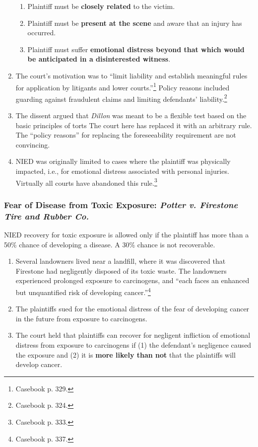 \begin{enumerate}
\begin{enumerate}
        \item Plaintiff must be \textbf{closely related} to the victim.
        \item Plaintiff must be \textbf{present at the scene} and aware that 
        an injury has occurred.
        \item Plaintiff must suffer \textbf{emotional distress beyond that 
        which would be anticipated in a disinterested witness}.
    \end{enumerate}
    \item The court's motivation was to ``limit liability and establish 
    meaningful rules for application by litigants and lower 
    courts.''\footnote{Casebook p. 329.} Policy reasons included guarding 
    against fraudulent claims and limiting defendants' 
    liability.\footnote{Casebook p. 324.}
    \item The dissent argued that \emph{Dillon} was meant to be a flexible 
    test based on the basic principles of torts The court here has replaced it 
    with an arbitrary rule. The ``policy reasons'' for replacing the 
    foreseeability requirement are not convincing.
    \item NIED was originally limited to cases where the plaintiff was 
    physically impacted, i.e., for emotional distress associated with personal 
    injuries. Virtually all courts have abandoned this rule.\footnote{Casebook 
    p. 333.}
\end{enumerate}

\subsubsection{Fear of Disease from Toxic Exposure: \emph{Potter v. Firestone 
Tire and Rubber Co.}}

NIED recovery for toxic exposure is allowed only if the plaintiff has more 
than a 50\% chance of developing a disease. A 30\% chance is not recoverable.

\begin{enumerate}
    \item Several landowners lived near a landfill, where it was discovered 
    that Firestone had negligently disposed of its toxic waste. The landowners 
    experienced prolonged exposure to carcinogens, and ``each faces an 
    enhanced but unquantified risk of developing cancer.''\footnote{Casebook 
    p. 337.}
    \item The plaintiffs sued for the emotional distress of the fear of 
    developing cancer in the future from exposure to carcinogens.
    \item The court held that plaintiffs can recover for negligent infliction 
    of emotional distress from exposure to carcinogens if (1) the defendant's 
    negligence caused the exposure and (2) it is \textbf{more likely than not} 
    that the plaintiffs will develop cancer.
\end{enumerate}
